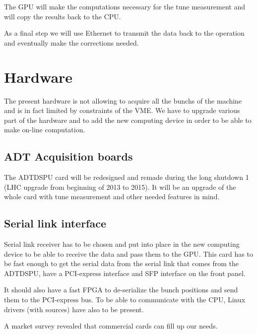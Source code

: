 The \gls{GPU} will make the computations necessary for the \gls{tune} measurement and will copy the results back to the \gls{CPU}.

As a final step we will use Ethernet to transmit the data back to the operation and eventually make the corrections needed.

\section{Hardware}

The present hardware is not allowing to acquire all the \glspl{bunch} of the machine and is in fact limited by constraints of the \gls{VME}. We have to upgrade various part of the hardware and to add the new computing device in order to be able to make on-line computation.

\subsection{ADT Acquisition boards}

The \gls{ADTDSPU} card will be redesigned and remade during the long shutdown 1 (\gls{LHC} upgrade from beginning of 2013 to 2015). It will be an upgrade of the whole card with \gls{tune} measurement and other needed features in mind.

\subsection{Serial link interface}

Serial link receiver has to be chosen and put into place in the new computing device to be able to receive the data and pass them to the \gls{GPU}. This card has to be fast enough to get the serial data from the serial link that comes from the ADTDSPU, have a PCI-express interface and \gls{SFP} interface on the front panel. 

It should also have a fast FPGA to de-serialize the bunch positions and send them to the PCI-express bus. To be able to communicate with the CPU, Linux drivers (with sources) have also to be present.

A market survey revealed that commercial cards can fill up our needs.

